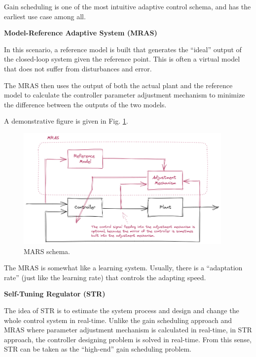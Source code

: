 Gain scheduling is one of the most intuitive adaptive control schema, and has the earliest use case among all.

\vspace{0.1in}
\noindent \textbf{Model-Reference Adaptive System (MRAS)}
\vspace{0.1in}

In this scenario, a reference model is built that generates the “ideal” output of the closed-loop system given the reference point. This is often a virtual model that does not suffer from disturbances and error.

The MRAS then uses the output of both the actual plant and the reference model to calculate the controller parameter adjustment mechanism to minimize the difference between the outputs of the two models.

A demonstrative figure is given in Fig. \ref{ch:acs:fig:mars_schema}.

\begin{figure}
	\centering
	\includegraphics[width=300pt]{chapters/ch-adaptive-control-system/figures/mars_schema.png}
	\caption{MARS schema.} \label{ch:acs:fig:mars_schema}
\end{figure}

The MRAS is somewhat like a learning system. Usually, there is a “adaptation rate” (just like the learning rate) that controls the adapting speed.

\vspace{0.1in}
\noindent \textbf{Self-Tuning Regulator (STR)}
\vspace{0.1in}

The idea of STR is to estimate the system process and design and change the whole control system in real-time. Unlike the gain scheduling approach and MRAS where parameter adjustment mechanism is calculated in real-time, in STR approach, the controller designing problem is solved in real-time. From this sense, STR can be taken as the “high-end” gain scheduling problem.

